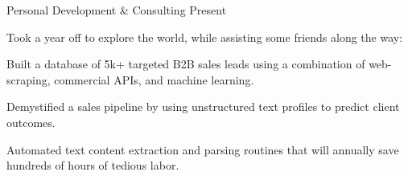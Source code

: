 
\begin{cventries}


  \cventrynew
	{Personal Development \& Consulting}    
    {Present} 
    {}
    {Took a year off to explore the world, while assisting some friends along the way:
    \vspace{4.0mm}
    \begin{cvitems}
		 \item {Built a database of 5k+ targeted B2B sales leads using a combination of web-scraping, commercial APIs, and machine learning.}
		 \item {Demystified a sales pipeline by using unstructured text profiles to predict client outcomes.}
		 \item {Automated text content extraction and parsing routines that will annually save hundreds of hours of tedious labor.}
      \end{cvitems}
    } 


\end{cventries}
